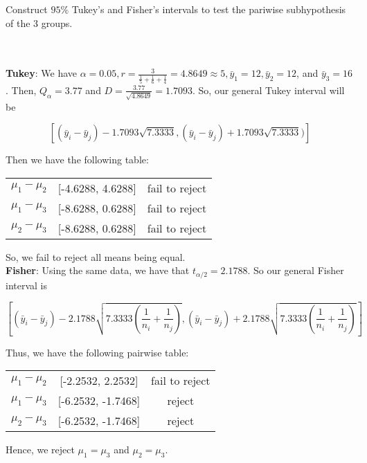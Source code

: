 Construct $95\%$ Tukey's and Fisher's intervals to test the pariwise subhypothesis of the 3 groups.\\\\

\begin{solution}\renewcommand{\qedsymbol}{}\ \\
    \textbf{Tukey}: We have
    $\alpha=0.05, r=\frac{3}{\frac15+\frac16+\frac14}=4.8649\approx5, \bar{y}_1=12, \bar{y}_2=12$, and
    $\bar{y}_3=16$. Then, $Q_{\alpha}=3.77$ and $D=\frac{3.77}{\sqrt{4.8649}}=1.7093$. So, our general
    Tukey interval will be

    $$[(\bar{y}_i-\bar{y}_j)-1.7093\sqrt{7.3333}, (\bar{y}_i-\bar{y}_j)+1.7093\sqrt{7.3333})]$$
    
    Then we have the following table:

    \begin{center}
        \begin{tabular}{ c   c   c  }
            $\mu_1-\mu_2$ & [-4.6288, 4.6288] & fail to reject\\
            $\mu_1-\mu_3$ & [-8.6288, 0.6288] & fail to reject\\
            $\mu_2-\mu_3$ & [-8.6288, 0.6288] & fail to reject
        \end{tabular}
    \end{center}

    So, we fail to reject all means being equal.\\
    \textbf{Fisher}: Using the same data, we have that $t_{\alpha/2}=2.1788$. So our general Fisher
    interval is
    
    $$[(\bar{y}_i-\bar{y}_j)-2.1788\sqrt{7.3333(\frac{1}{n_i}+\frac{1}{n_j})},
    (\bar{y}_i-\bar{y}_j)+2.1788\sqrt{7.3333(\frac{1}{n_i}+\frac{1}{n_j})}]$$
    
    Thus, we have the following pairwise table:

    \begin{center}
        \begin{tabular}{ c   c   c  }
            $\mu_1-\mu_2$ & [-2.2532, 2.2532] & fail to reject\\
            $\mu_1-\mu_3$ & [-6.2532, -1.7468] & reject\\
            $\mu_2-\mu_3$ & [-6.2532, -1.7468] & reject
        \end{tabular}
    \end{center}

    Hence, we reject $\mu_1=\mu_3$ and $\mu_2=\mu_3$.

\end{solution}